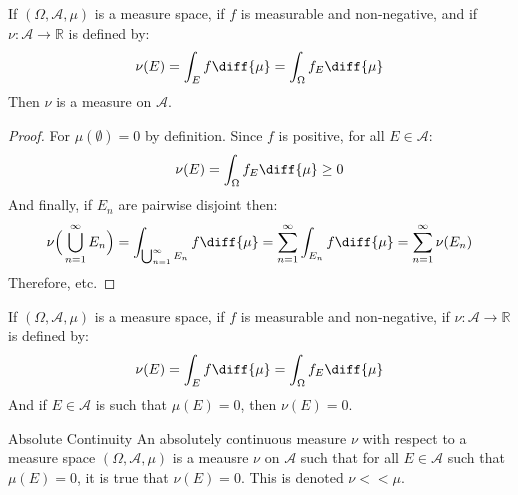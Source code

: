             \begin{theorem}
                If $(\Omega,\mathcal{A},\mu)$ is a measure space,
                if $f$ is measurable and non-negative, and if
                $\nu:\mathcal{A}\rightarrow\mathbb{R}$ is defined by:
                \begin{equation}
                    \nu(E)=\int_{E}f\diff{\mu}=
                    \int_{\Omega}f_{E}\diff{\mu}
                \end{equation}
                Then $\nu$ is a measure on $\mathcal{A}$.
            \end{theorem}
            \begin{proof}
                For $\mu(\emptyset)=0$ by definition. Since $f$ is positive,
                for all $E\in\mathcal{A}$:
                \begin{equation}
                    \nu(E)=\int_{\Omega}f_{E}\diff{\mu}\geq{0}
                \end{equation}
                And finally, if $E_{n}$ are pairwise disjoint then:
                \begin{equation}
                    \nu\Big(\bigcup_{n=1}^{\infty}E_{n}\Big)=
                    \int_{\bigcup_{n=1}^{\infty}E_{n}}f\diff{\mu}
                    =\sum_{n=1}^{\infty}\int_{E_{n}}f\diff{\mu}
                    =\sum_{n=1}^{\infty}\nu(E_{n})
                \end{equation}
                Therefore, etc.
            \end{proof}
            \begin{theorem}
                If $(\Omega,\mathcal{A},\mu)$ is a measure space,
                if $f$ is measurable and non-negative, if
                $\nu:\mathcal{A}\rightarrow\mathbb{R}$ is defined by:
                \begin{equation}
                    \nu(E)=\int_{E}f\diff{\mu}=
                    \int_{\Omega}f_{E}\diff{\mu}
                \end{equation}
                And if $E\in\mathcal{A}$ is such that $\mu(E)=0$, then
                $\nu(E)=0$.
            \end{theorem}
            \begin{ldefinition}{Absolute Continuity}
                An absolutely continuous measure $\nu$ with respect
                to a measure space $(\Omega,\mathcal{A},\mu)$ is a meausre
                $\nu$ on $\mathcal{A}$ such that for all $E\in\mathcal{A}$
                such that $\mu(E)=0$, it is true that $\nu(E)=0$. This is
                denoted $\nu<<\mu$.
            \end{ldefinition}
